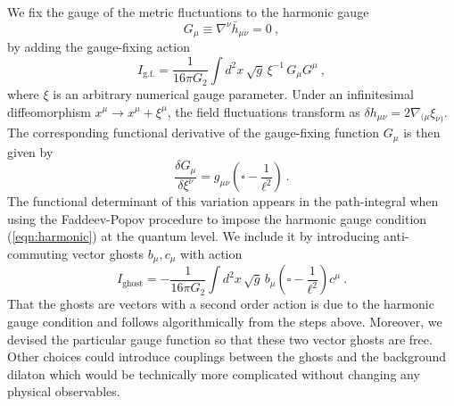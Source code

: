 \documentclass[12pt]{article}
\begin{document}
We fix the gauge of the metric fluctuations to the harmonic gauge
\begin{equation}
	G_\mu \equiv \nabla^\nu \bar{h}_{\mu\nu}=0~,
	\label{eqn:harmonic}
\end{equation}
by adding the gauge-fixing action
\begin{equation}
	I_\text{g.f.} = \frac{1}{16\pi G_2}\int d^2x\,\sqrt{g}\, \xi^{-1}\,G_\mu G^\mu~, 
\label{eq:sgf}
\end{equation}
where $\xi$ is an arbitrary numerical gauge parameter.  Under an infinitesimal diffeomorphism $x^\mu \to x^\mu + \xi^\mu$, the field fluctuations transform as $\delta h_{\mu\nu} = 2 \nabla_{(\mu}\xi_{\nu)}$. The corresponding functional derivative of the gauge-fixing function $G_\mu$ is then given by
\begin{equation}
	\frac{\delta G_{\mu}}{\delta \xi^\nu} = g_{\mu\nu}\left(\square -\frac{1}{\ell^2}\right)~.
\end{equation}
The functional determinant of this variation appears in the path-integral when using the Faddeev-Popov procedure to impose the harmonic gauge 
condition (\ref{eqn:harmonic}) at the quantum level. We include it by introducing anti-commuting vector ghosts $b_\mu,c_\mu$ with action
\begin{equation}
	I_\text{ghost} = -\frac{1}{16\pi G_2}\int d^2x\,\sqrt{g}\, b_\mu\left(\square -\frac{1}{\ell^2} \right) c^\mu~.
\label{eq:sgh}
\end{equation}
That the ghosts are vectors with a second order action is due to the harmonic gauge condition and follows algorithmically from the steps above. Moreover, we devised the particular gauge function so that these two vector ghosts are free. Other choices could introduce couplings between the ghosts and the background dilaton which would be technically more complicated without changing any physical observables.
\end{document}
